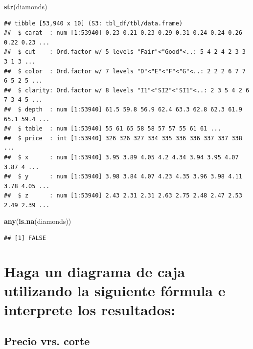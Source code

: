 \documentclass[
]{article}
\newenvironment{Shaded}{\begin{snugshade}}{\end{snugshade}}
\newcommand{\KeywordTok}[1]{\textcolor[rgb]{0.13,0.29,0.53}{\textbf{#1}}}
\newcommand{\NormalTok}[1]{#1}
\begin{document}
\begin{Shaded}
\begin{Highlighting}[]
\KeywordTok{str}\NormalTok{(diamonds)}
\end{Highlighting}
\end{Shaded}

\begin{verbatim}
## tibble [53,940 x 10] (S3: tbl_df/tbl/data.frame)
##  $ carat  : num [1:53940] 0.23 0.21 0.23 0.29 0.31 0.24 0.24 0.26 0.22 0.23 ...
##  $ cut    : Ord.factor w/ 5 levels "Fair"<"Good"<..: 5 4 2 4 2 3 3 3 1 3 ...
##  $ color  : Ord.factor w/ 7 levels "D"<"E"<"F"<"G"<..: 2 2 2 6 7 7 6 5 2 5 ...
##  $ clarity: Ord.factor w/ 8 levels "I1"<"SI2"<"SI1"<..: 2 3 5 4 2 6 7 3 4 5 ...
##  $ depth  : num [1:53940] 61.5 59.8 56.9 62.4 63.3 62.8 62.3 61.9 65.1 59.4 ...
##  $ table  : num [1:53940] 55 61 65 58 58 57 57 55 61 61 ...
##  $ price  : int [1:53940] 326 326 327 334 335 336 336 337 337 338 ...
##  $ x      : num [1:53940] 3.95 3.89 4.05 4.2 4.34 3.94 3.95 4.07 3.87 4 ...
##  $ y      : num [1:53940] 3.98 3.84 4.07 4.23 4.35 3.96 3.98 4.11 3.78 4.05 ...
##  $ z      : num [1:53940] 2.43 2.31 2.31 2.63 2.75 2.48 2.47 2.53 2.49 2.39 ...
\end{verbatim}

\begin{Shaded}
\begin{Highlighting}[]
\KeywordTok{any}\NormalTok{(}\KeywordTok{is.na}\NormalTok{(diamonds))}
\end{Highlighting}
\end{Shaded}

\begin{verbatim}
## [1] FALSE
\end{verbatim}

\hypertarget{haga-un-diagrama-de-caja-utilizando-la-siguiente-fuxf3rmula-e-interprete-los-resultados}{%
\section{Haga un diagrama de caja utilizando la siguiente fórmula e
interprete los
resultados:}\label{haga-un-diagrama-de-caja-utilizando-la-siguiente-fuxf3rmula-e-interprete-los-resultados}}

\hypertarget{precio-vrs.-corte}{%
\subsection{Precio vrs. corte}\label{precio-vrs.-corte}}
\end{document}

